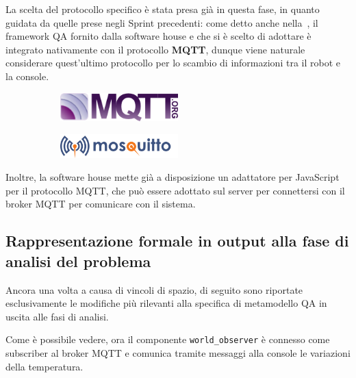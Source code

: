 La scelta del protocollo specifico è stata presa già in questa fase, in quanto guidata da quelle prese negli Sprint precedenti:
come detto anche nella~, il framework QA fornito dalla software house e che si è scelto di adottare è integrato nativamente con il protocollo \textbf{MQTT},
dunque viene naturale considerare quest'ultimo protocollo per lo scambio di informazioni tra il robot e la console.

\begin{figure}
  \centering
  \begin{subfigure}[b]{0.45\textwidth}
    \centering
    \includegraphics[width=0.5\textwidth]{res/mqttorg.png}%
    \label{subfig:sp3:mqtt}
  \end{subfigure}
  \hfill
  \begin{subfigure}[b]{0.45\textwidth}
    \centering
    \includegraphics[width=0.5\textwidth]{res/mosquitto.png}%
    \label{subfig:sp3:mosquitto}
  \end{subfigure}%
  \label{fig:sp3:mqtt}
\end{figure}

Inoltre, la software house mette già a disposizione un adattatore per JavaScript per il protocollo MQTT, che può essere adottato sul server per connettersi con il broker MQTT per comunicare con il sistema.

\subsection[Rappresentazione formale]{Rappresentazione formale in output alla fase di analisi del problema}

Ancora una volta a causa di vincoli di spazio, di seguito sono riportate esclusivamente le modifiche più rilevanti alla specifica di metamodello QA in uscita alle fasi di analisi.



Come è possibile vedere, ora il componente \texttt{world\_observer} è connesso come subscriber al broker MQTT e comunica tramite messaggi alla console le variazioni della temperatura.

